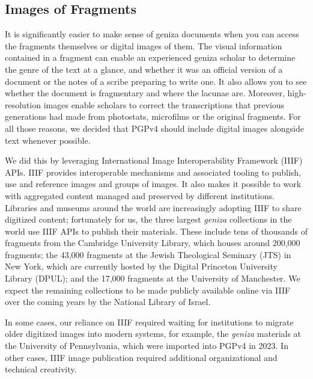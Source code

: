 \documentclass{article}
\begin{document}
\subsection{Images of Fragments}

It is significantly easier to make sense of geniza documents when you can access the fragments themselves or digital images of them. The visual information contained in a fragment can enable an experienced geniza scholar to determine the genre of the text at a glance, and whether it was an official version of a document or the notes of a scribe preparing to write one. It also allows you to see whether the document is fragmentary and where the lacunae are. Moreover, high-resolution images enable scholars to correct the transcriptions that previous generations had made from photostats, microfilms or the original fragments. For all those reasons, we decided that PGPv4 should include digital images alongside text whenever possible. 

We did this by leveraging International Image Interoperability Framework (IIIF) APIs. IIIF provides interoperable mechanisms and associated tooling to publish, use and reference images and groups of images. It also makes it possible to work with aggregated content managed and preserved by different institutions. Libraries and museums around the world are increasingly adopting IIIF to share digitized content; fortunately for us, the three largest \textit{geniza }collections in the world use IIIF APIs to publish their materials. These include tens of thousands of fragments from the Cambridge University Library, which houses around 200,000 fragments; the 43,000 fragments at the Jewish Theological Seminary (JTS) in New York, which are currently hosted by the Digital Princeton University Library (DPUL); and the 17,000 fragments at the University of Manchester. We expect the remaining collections to be made publicly available online via IIIF over the coming years by the National Library of Israel.

In some cases, our reliance on IIIF required waiting for institutions to migrate older digitized images into modern systems, for example, the\textit{ geniza} materials at the University of Pennsylvania, which were imported into PGPv4 in 2023.  In other cases, IIIF image publication required additional organizational and technical creativity. 
\end{document}

